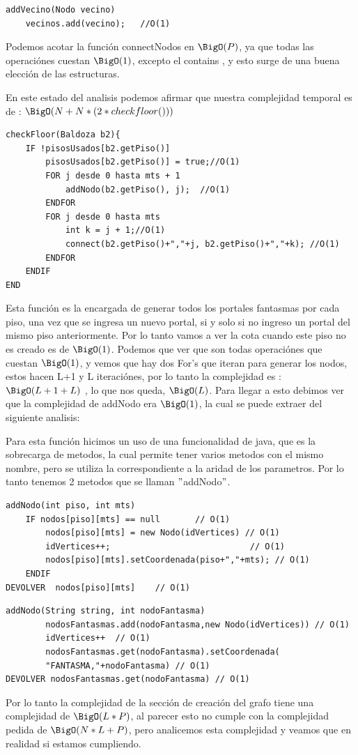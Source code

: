 \begin{lstlisting}
addVecino(Nodo vecino) 
	vecinos.add(vecino);   //O(1)
\end{lstlisting}

Podemos acotar la funci\'on connectNodos en $\BigO(P)$, ya que todas las operaci\'ones cuestan $\BigO(1)$, excepto el contains , y esto surge de una buena elecci\'on de las estructuras.

En este estado del analisis podemos afirmar que nuestra complejidad temporal es de : $\BigO(N + N * (2 * checkfloor()))$


\begin{lstlisting}
checkFloor(Baldoza b2){
	IF !pisosUsados[b2.getPiso()]
	    pisosUsados[b2.getPiso()] = true;//O(1)
		FOR j desde 0 hasta mts + 1
			addNodo(b2.getPiso(), j);  //O(1)
		ENDFOR
		FOR j desde 0 hasta mts 
			int k = j + 1;//O(1)
			connect(b2.getPiso()+","+j, b2.getPiso()+","+k); //O(1)
		ENDFOR
	ENDIF
END
\end{lstlisting}
Esta funci\'on es la encargada de generar todos los portales fantasmas por cada piso, una vez que se ingresa un nuevo portal, si y solo si no ingreso un portal del mismo piso anteriormente. Por lo tanto vamos a ver la cota cuando este piso no es creado es de $\BigO(1)$.
Podemos que ver que son todas operaci\'ones que cuestan $\BigO(1)$, y vemos que hay dos For's que iteran para generar los nodos, estos hacen L+1 y L iteraci\'ones, por lo tanto la complejidad es : $\BigO(L+1 + L)$ , lo que nos queda, $\BigO(L)$. Para llegar a esto debimos ver que la complejidad de addNodo era $\BigO(1)$, la cual se puede extraer del siguiente analisis:

Para esta funci\'on hicimos un uso de una funcionalidad de java, que es la sobrecarga de metodos, la cual permite tener varios metodos con el mismo nombre, pero se utiliza la correspondiente a la aridad de los parametros. Por lo tanto tenemos 2 metodos que se llaman $"$addNodo$"$.

\pagebreak

\begin{lstlisting}
addNodo(int piso, int mts)
    IF nodos[piso][mts] == null       // O(1)
        nodos[piso][mts] = new Nodo(idVertices) // O(1)
		idVertices++;                            // O(1)
		nodos[piso][mts].setCoordenada(piso+","+mts); // O(1)
    ENDIF
DEVOLVER  nodos[piso][mts]    // O(1)
\end{lstlisting}

\begin{lstlisting}
addNodo(String string, int nodoFantasma) 
		nodosFantasmas.add(nodoFantasma,new Nodo(idVertices)) // O(1)
		idVertices++  // O(1)
		nodosFantasmas.get(nodoFantasma).setCoordenada(
		"FANTASMA,"+nodoFantasma) // O(1) 
DEVOLVER nodosFantasmas.get(nodoFantasma) // O(1)
\end{lstlisting}
Por lo tanto la complejidad de la secci\'on de creaci\'on del grafo tiene una complejidad de  $\BigO(L * P)$, al parecer esto no cumple con la complejidad pedida de $\BigO(N * L + P)$, pero analicemos esta complejidad y veamos que en realidad si estamos cumpliendo.


